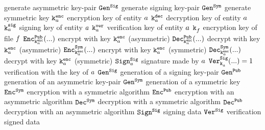 {                {generate asymmetric key-pair}
    \threecolsnl{}
                {\( \mathtt{Gen}^{\mathtt{Sig}}_{} \)}
                {generate signing key-pair}
    \threecolsnl{}
                {\( \mathtt{Gen}^{\mathtt{Sym}}_{} \)}
                {generate symmetric key}
    \threecolsnl{}
                {\( \mathtt{k}^{\mathtt{enc}}_{a} \)}
                {encryption key of entity \( a \)}
    \threecolsnl{}
                {\( \mathtt{k}^{\mathtt{dec}}_{a} \)}
                {decryption key of entity \( a \)}
    \threecolsnl{}
                {\( \mathtt{k}^{\mathtt{sig}}_{a} \)}
                {signing key of entity \( a \)}
    \threecolsnl{}
                {\( \mathtt{k}^{\mathtt{ver}}_{a} \)}
                {verification key of entity \( a \)}
    \threecolsnl{}
                {\( \mathtt{k}^{}_{f} \)}
                {encryption key of file \( f \)}
    \threecolsnl{}
                {\( \mathtt{Enc}^{\mathtt{Pub}}_{\mathtt{k}^{\mathtt{enc}}_{a}}(...) \)}
                {encrypt with key \( \mathtt{k}^{\mathtt{enc}}_{a} \) (asymmetric)}
    \threecolsnl{}
                {\( \mathtt{Dec}^{\mathtt{Pub}}_{\mathtt{k}^{\mathtt{enc}}_{a}}(...) \)}
                {decrypt with key \( \mathtt{k}^{\mathtt{enc}}_{a} \) (asymmetric)} 
    \threecolsnl{}
                {\( \mathtt{Enc}^{\mathtt{Sym}}_{\mathtt{k}^{\mathtt{enc}}_{a}}(...) \)}
                {encrypt with key \( \mathtt{k}^{\mathtt{enc}}_{a} \) (symmetric)}
    \threecolsnl{}
                {\( \mathtt{Dec}^{\mathtt{Sym}}_{\mathtt{k}^{\mathtt{enc}}_{a}}(...) \)}
                {decrypt with key \( \mathtt{k}^{\mathtt{enc}}_{a} \) (symmetric)} 
    \threecolsnl{}
                {\( \mathtt{Sign}^{\mathtt{Sig}}_{a} \)}
                {signature made by \( a \)}
    \threecolsnl{}
                {\( \mathtt{Ver}^{\mathtt{Sig}}_{\mathtt{k}^{}_{a}}(\allowbreak ... \allowbreak) \allowbreak = \allowbreak 1 \)}
                {verification with the key of \( a \)}
    \hline
                {\( \mathtt{Gen}^{\mathtt{Sig}}_{} \)}
                {generation of a signing key-pair}
    \threecolsnl{}
                {\( \mathtt{Gen}^{\mathtt{Pub}}_{} \)}
                {generation of an asymmetric key-pair}
    \threecolsnl{}
                {\( \mathtt{Gen}^{\mathtt{Sym}}_{} \)}
                {generation of a symmetric key}
    \threecolsnl{}
                {\( \mathtt{Enc}^{\mathtt{Sym}}_{} \)}
                {encryption with a symmetric algorithm}
    \threecolsnl{}
                {\( \mathtt{Enc}^{\mathtt{Pub}}_{} \)}
                {encryption with an asymmetric algorithm}
    \threecolsnl{}
                {\( \mathtt{Dec}^{\mathtt{Sym}}_{} \)}
                {decryption with a symmetric algorithm}
    \threecolsnl{}
                {\( \mathtt{Dec}^{\mathtt{Pub}}_{} \)}
                {decryption with an asymmetric algorithm}
    \threecolsnl{}
                {\( \mathtt{Sign}^{\mathtt{Sig}}_{} \)}
                {signing data}
    \threecolsnl{}
                {\( \mathtt{Ver}^{\mathtt{Sig}}_{} \)}
                {verification signed data}
    \hline
}


